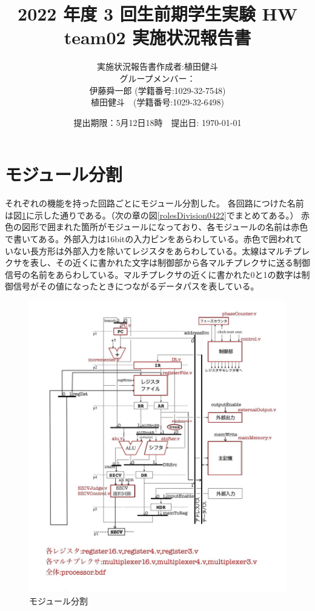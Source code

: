 \documentclass[a4j,titlepage]{jarticle}
\begin{document}
\title{2022 年度 3 回生前期学生実験 HW  \\ \bf team02 実施状況報告書}
\author{実施状況報告書作成者:植田健斗\\
グループメンバー：\\伊藤舜一郎 (学籍番号:1029-32-7548)
\\植田健斗　(学籍番号:1029-32-6498)}
\date{提出期限：5月12日18時　提出日: \today} %
\maketitle
\newpage

\section{モジュール分割}

それぞれの機能を持った回路ごとにモジュール分割した。
各回路につけた名前は図\ref{moduleSplit0422}に示した通りである。（次の章の図\ref{rolesDivision0422}でまとめてある。）
赤色の図形で囲まれた箇所がモジュールになっており、各モジュールの名前は赤色で書いてある。外部入力は16bitの入力ピンをあらわしている。赤色で囲われていない長方形は外部入力を除いてレジスタをあらわしている。太線はマルチプレクサを表し、その近くに書かれた文字は制御部から各マルチプレクサに送る制御信号の名前をあらわしている。マルチプレクサの近くに書かれた0と1の数字は制御信号がその値になったときにつながるデータパスを表している。


\begin{figure}[H]
    \begin{center}
    \includegraphics[scale = 0.22]{moduleSplit0506.jpg}
    \end{center}
    \caption{モジュール分割}
    \label{moduleSplit0422}
\end{figure}
\end{document}
